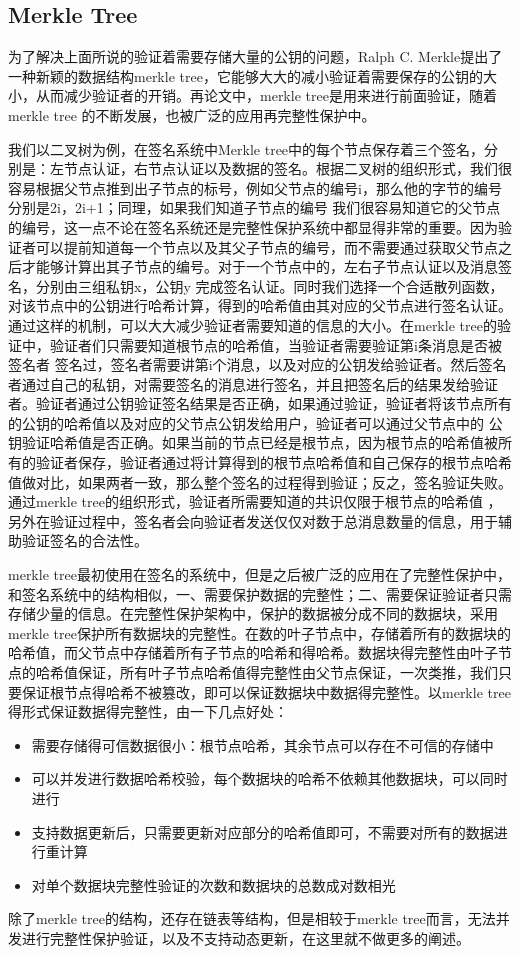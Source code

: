 \subsection{Merkle Tree}
为了解决上面所说的验证着需要存储大量的公钥的问题，Ralph C. Merkle提出了一种新颖的数据结构merkle tree，它能够大大的减小验证着需要保存的公钥的大小，从而减少验证者的开销。再论文中，merkle tree是用来进行前面验证，随着merkle tree
的不断发展，也被广泛的应用再完整性保护中。

我们以二叉树为例，在签名系统中Merkle tree中的每个节点保存着三个签名，分别是：左节点认证，右节点认证以及数据的签名。根据二叉树的组织形式，我们很容易根据父节点推到出子节点的标号，例如父节点的编号i，那么他的字节的编号分别是2i，2i+1；同理，如果我们知道子节点的编号
我们很容易知道它的父节点的编号，这一点不论在签名系统还是完整性保护系统中都显得非常的重要。因为验证者可以提前知道每一个节点以及其父子节点的编号，而不需要通过获取父节点之后才能够计算出其子节点的编号。对于一个节点中的，左右子节点认证以及消息签名，分别由三组私钥x，公钥y
完成签名认证。同时我们选择一个合适散列函数，对该节点中的公钥进行哈希计算，得到的哈希值由其对应的父节点进行签名认证。通过这样的机制，可以大大减少验证者需要知道的信息的大小。在merkle tree的验证中，验证者们只需要知道根节点的哈希值，当验证者需要验证第i条消息是否被签名者
签名过，签名者需要讲第i个消息，以及对应的公钥发给验证者。然后签名者通过自己的私钥，对需要签名的消息进行签名，并且把签名后的结果发给验证者。验证者通过公钥验证签名结果是否正确，如果通过验证，验证者将该节点所有的公钥的哈希值以及对应的父节点公钥发给用户，验证者可以通过父节点中的
公钥验证哈希值是否正确。如果当前的节点已经是根节点，因为根节点的哈希值被所有的验证者保存，验证者通过将计算得到的根节点哈希值和自己保存的根节点哈希值做对比，如果两者一致，那么整个签名的过程得到验证；反之，签名验证失败。通过merkle tree的组织形式，验证者所需要知道的共识仅限于根节点的哈希值
，另外在验证过程中，签名者会向验证者发送仅仅对数于总消息数量的信息，用于辅助验证签名的合法性。

merkle tree最初使用在签名的系统中，但是之后被广泛的应用在了完整性保护中，和签名系统中的结构相似，一、需要保护数据的完整性；二、需要保证验证者只需存储少量的信息。在完整性保护架构中，保护的数据被分成不同的数据块，采用merkle tree保护所有数据块的完整性。在数的叶子节点中，存储着所有的数据块的
哈希值，而父节点中存储着所有子节点的哈希和得哈希。数据块得完整性由叶子节点的哈希值保证，所有叶子节点哈希值得完整性由父节点保证，一次类推，我们只要保证根节点得哈希不被篡改，即可以保证数据块中数据得完整性。以merkle tree得形式保证数据得完整性，由一下几点好处：
\begin{itemize}
    \item 需要存储得可信数据很小：根节点哈希，其余节点可以存在不可信的存储中
    \item 可以并发进行数据哈希校验，每个数据块的哈希不依赖其他数据块，可以同时进行
    \item 支持数据更新后，只需要更新对应部分的哈希值即可，不需要对所有的数据进行重计算
    \item 对单个数据块完整性验证的次数和数据块的总数成对数相光
\end{itemize}
除了merkle tree的结构，还存在链表等结构，但是相较于merkle tree而言，无法并发进行完整性保护验证，以及不支持动态更新，在这里就不做更多的阐述。

